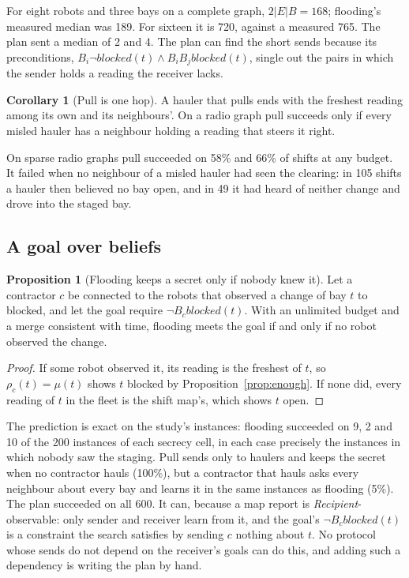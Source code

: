 \documentclass[11pt,a4paper]{article}
\theoremstyle{definition}
\newtheorem{proposition}{Proposition}
\newtheorem{corollary}{Corollary}
\newcommand{\Bop}[1]{B_{#1}}
\newcommand{\blocked}{\mathit{blocked}}
\newcommand{\merged}{\mu}
\begin{document}
For eight robots and three bays on a complete graph, $2|E|B = 168$; flooding's
measured median was 189. For sixteen it is 720, against a measured 765. The plan
sent a median of 2 and 4. The plan can find the short sends because its
preconditions, $\Bop{i}\neg\blocked(t) \wedge \Bop{i}\Bop{j}\blocked(t)$, single out
the pairs in which the sender holds a reading the receiver lacks.

\begin{corollary}[Pull is one hop]
\label{cor:pull}
A hauler that pulls ends with the freshest reading among its own and its
neighbours'. On a radio graph pull succeeds only if every misled hauler has a
neighbour holding a reading that steers it right.
\end{corollary}

On sparse radio graphs pull succeeded on 58\% and 66\% of shifts at any budget.
It failed when no neighbour of a misled hauler had seen the clearing: in 105 shifts
a hauler then believed no bay open, and in 49 it had heard of neither change and
drove into the staged bay.

\subsection{A goal over beliefs}

\begin{proposition}[Flooding keeps a secret only if nobody knew it]
\label{prop:secret}
Let a contractor $c$ be connected to the robots that observed a change of bay $t$
to blocked, and let the goal require $\neg\Bop{c}\blocked(t)$. With an unlimited
budget and a merge consistent with time, flooding meets the goal if and only if no
robot observed the change.
\end{proposition}

\begin{proof}
If some robot observed it, its reading is the freshest of $t$, so
$\rho_c(t) = \merged(t)$ shows $t$ blocked by Proposition~\ref{prop:enough}. If none
did, every reading of $t$ in the fleet is the shift map's, which shows $t$ open.
\end{proof}

The prediction is exact on the study's instances: flooding succeeded on 9, 2 and
10 of the 200 instances of each secrecy cell, in each case precisely the instances
in which nobody saw the staging. Pull sends only to haulers and keeps the secret
when no contractor hauls (100\%), but a contractor that hauls asks every neighbour
about every bay and learns it in the same instances as flooding (5\%). The plan
succeeded on all 600. It can, because a map report is \emph{Recipient}-observable:
only sender and receiver learn from it, and the goal's
$\neg\Bop{c}\blocked(t)$ is a constraint the search satisfies by sending $c$ nothing
about $t$. No protocol whose sends do not depend on the receiver's goals can do
this, and adding such a dependency is writing the plan by hand.
\end{document}
